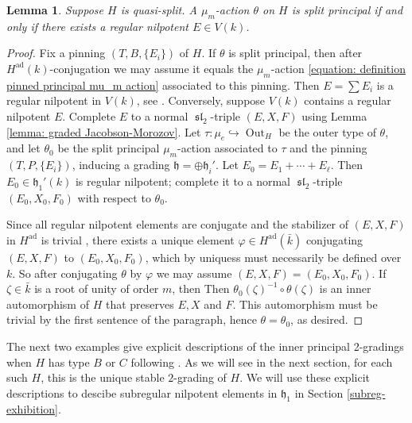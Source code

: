 \documentclass{article} %
\newtheorem{lemma}[proposition]{Lemma}
\numberwithin{equation}{section}
\theoremstyle{definition}
\DeclareMathOperator{\liesl}{\mathfrak{sl}}
\DeclareMathOperator{\Out}{Out}
\newcommand{\frakh}{\mathfrak h}
\begin{document}
\begin{lemma}\label{lemma: split principal if and only if regular nilpotent exists}
    Suppose $H$ is quasi-split.
    A $\mu_m$-action $\theta$ on $H$ is split principal if and only if there exists a regular nilpotent $E\in V(k)$.
\end{lemma}
\begin{proof}
    Fix a pinning $(T, B, \{E_i\})$ of $H$.
    If $\theta$ is split principal, then after $H^{\mathrm{ad}}(k)$-conjugation we may assume it equals the $\mu_m$-action \eqref{equation: definition pinned principal mu_m action} associated to this pinning.
    Then $E = \sum E_i$ is a regular nilpotent in $V(k)$, see \cite[Section 5, Corollary 5.3]{Kostant-principalthreedimensional}.
    Conversely, suppose $V(k)$ contains a regular nilpotent $E$.
    Complete $E$ to a normal $\liesl_2$-triple $(E,X,F)$ using Lemma \ref{lemma: graded Jacobson-Morozov}.
    Let $\tau\colon \mu_e\hookrightarrow \Out_H$ be the outer type of $\theta$, and let $\theta_0$ be the split principal $\mu_m$-action associated to $\tau$ and the pinning $(T, P,\{E_i\})$, inducing a grading $\frakh= \oplus \frakh_i'$.
    Let $E_0 = E_1+ \cdots + E_{\ell}$.
    Then $E_0\in \frakh_1'(k)$ is regular nilpotent; complete it to a normal $\liesl_2$-triple $(E_0,X_0,F_0)$ with respect to $\theta_0$.

    Since all regular nilpotent elements are conjugate and the stabilizer of $(E,X,F)$ in $H^{\mathrm{ad}}$ is trivial \cite[Section 5, Corollaries 5.2 and 5.5]{Kostant-principalthreedimensional}, there exists a unique element $\varphi\in H^{\mathrm{ad}}(\bar{k})$ conjugating $(E,X,F)$ to $(E_0,X_0,F_0)$, which by uniquess must necessarily be defined over $k$.
    So after conjugating $\theta$ by $\varphi$ we may assume $(E,X,F) = (E_0,X_0,F_0)$.
    If $\zeta\in \bar{k}$ is a root of unity of order $m$, then
    Then $\theta_0(\zeta)^{-1} \circ \theta(\zeta)$ is an inner automorphism of $H$ that preserves $E,X$ and $F$.
    This automorphism must be trivial by the first sentence of the paragraph, hence $\theta = \theta_0$, as desired.
\end{proof}





 The next two examples give explicit descriptions of the inner principal 2-gradings when $H$ has type $B$ or $C$ following \cite{Ohta-classificationadmissiblenilpotent}. As we will see in the next section, for each such $H$, this is the unique stable $2$-grading of $H$. We will use these explicit descriptions to descibe subregular nilpotent elements in $\frakh_1$ in Section \ref{subreg-exhibition}. 
\end{document}
